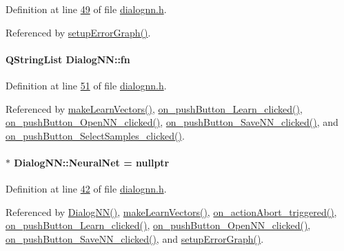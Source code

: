 Definition at line \hyperlink{dialognn_8h_source_l00049}{49} of file \hyperlink{dialognn_8h_source}{dialognn.\+h}.



Referenced by \hyperlink{dialognn_8cpp_source_l00058}{setup\+Error\+Graph()}.

\hypertarget{class_dialog_n_n_ac37477ba2781da043e5b2ce9495ea45f}{}
\paragraph[{fn}]{\setlength{\rightskip}{0pt plus 5cm}Q\+String\+List Dialog\+N\+N\+::fn\hspace{0.3cm}{\ttfamily [private]}}\label{class_dialog_n_n_ac37477ba2781da043e5b2ce9495ea45f}


Definition at line \hyperlink{dialognn_8h_source_l00051}{51} of file \hyperlink{dialognn_8h_source}{dialognn.\+h}.



Referenced by \hyperlink{dialognn_8cpp_source_l00097}{make\+Learn\+Vectors()}, \hyperlink{dialognn_8cpp_source_l00086}{on\+\_\+push\+Button\+\_\+\+Learn\+\_\+clicked()}, \hyperlink{dialognn_8cpp_source_l00130}{on\+\_\+push\+Button\+\_\+\+Open\+N\+N\+\_\+clicked()}, \hyperlink{dialognn_8cpp_source_l00118}{on\+\_\+push\+Button\+\_\+\+Save\+N\+N\+\_\+clicked()}, and \hyperlink{dialognn_8cpp_source_l00075}{on\+\_\+push\+Button\+\_\+\+Select\+Samples\+\_\+clicked()}.

\hypertarget{class_dialog_n_n_a1d38f96a8f11697068e805fdaa3267b2}{}
\paragraph[{Neural\+Net}]{$\ast$ Dialog\+N\+N\+::\+Neural\+Net = nullptr\hspace{0.3cm}{\ttfamily [private]}}\label{class_dialog_n_n_a1d38f96a8f11697068e805fdaa3267b2}


Definition at line \hyperlink{dialognn_8h_source_l00042}{42} of file \hyperlink{dialognn_8h_source}{dialognn.\+h}.



Referenced by \hyperlink{dialognn_8cpp_source_l00004}{Dialog\+N\+N()}, \hyperlink{dialognn_8cpp_source_l00097}{make\+Learn\+Vectors()}, \hyperlink{dialognn_8cpp_source_l00147}{on\+\_\+action\+Abort\+\_\+triggered()}, \hyperlink{dialognn_8cpp_source_l00086}{on\+\_\+push\+Button\+\_\+\+Learn\+\_\+clicked()}, \hyperlink{dialognn_8cpp_source_l00130}{on\+\_\+push\+Button\+\_\+\+Open\+N\+N\+\_\+clicked()}, \hyperlink{dialognn_8cpp_source_l00118}{on\+\_\+push\+Button\+\_\+\+Save\+N\+N\+\_\+clicked()}, and \hyperlink{dialognn_8cpp_source_l00058}{setup\+Error\+Graph()}.

